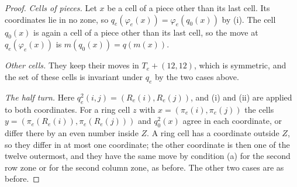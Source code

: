 \documentclass[11pt]{amsart}
\theoremstyle{remark}
\begin{document}
\begin{proof}
\emph{Cells of pieces.} Let $x$ be a cell of a piece other than its last cell. Its coordinates lie in no zone, so
$q_e(\varphi_e(x))=\varphi_e(q_0(x))$ by (i). The cell $q_0(x)$ is again a cell of a piece other than its
last cell, so the move at $q_e(\varphi_e(x))$ is $m(q_0(x))=q(m(x))$.

\emph{Other cells.} They keep their moves in $T_e+(12,12)$, which is symmetric, and the set of these cells is
invariant under $q_e$ by the two cases above.

\emph{The half turn.} Here $q_e^2(i,j)=(R_e(i),R_e(j))$, and (i) and (ii) are applied to both coordinates. For a
ring cell $z$ with $x=(\pi_e(i),\pi_e(j))$ the cells $y=(\pi_e(R_e(i)),\pi_e(R_e(j)))$ and $q_0^2(x)$ agree in
each coordinate, or differ there by an even number inside $Z$. A ring cell has a coordinate outside $Z$, so they
differ in at most one coordinate; the other coordinate is then one of the twelve outermost, and they have the same
move by condition (a) for the second row zone or for the second column zone, as before. The other two cases are as before.
\end{proof}
\end{document}
